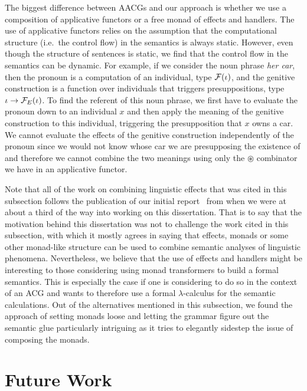 \begin{itemize}
  The biggest difference between AACGs and our approach is whether we use a
  composition of applicative functors or a free monad of effects and
  handlers. The use of applicative functors relies on the assumption that
  the computational structure (i.e.\ the control flow) in the semantics is
  always static. However, even though the structure of sentences is static,
  we find that the control flow in the semantics can be dynamic. For
  example, if we consider the noun phrase \emph{her car}, then the pronoun
  is a computation of an individual, type $\mathcal{F}(\iota)$, and the genitive
  construction is a function over individuals that triggers
  presuppositions, type $\iota \to \mathcal{F}_E(\iota)$. To find the referent of
  this noun phrase, we first have to evaluate the pronoun down to an
  individual $x$ and then apply the meaning of the genitive construction to
  this individual, triggering the presupposition that $x$ owns a car. We
  cannot evaluate the effects of the genitive construction independently of
  the pronoun since we would not know whose car we are presupposing the
  existence of and therefore we cannot combine the two meanings using only
  the $\circledast$ combinator we have in an applicative functor.

\end{itemize}

Note that all of the work on combining linguistic effects that was cited in
this subsection follows the publication of our initial
report~\cite{marsik2014algebraic} from when we were at about a third of the
way into working on this dissertation. That is to say that the motivation
behind this dissertation was not to challenge the work cited in this
subsection, with which it mostly agrees in saying that effects, monads or
some other monad-like structure can be used to combine semantic analyses of
linguistic phenomena. Nevertheless, we believe that the use of effects and
handlers might be interesting to those considering using monad transformers
to build a formal semantics. This is especially the case if one is
considering to do so in the context of an ACG and wants to therefore use a
formal $\lambda$-calculus for the semantic calculations. Out of the
alternatives mentioned in this subsection, we found the approach of setting
monads loose and letting the grammar figure out the semantic glue
particularly intriguing as it tries to elegantly sidestep the issue of
composing the monads.


\section{Future Work}
\label{sec:future-work}

